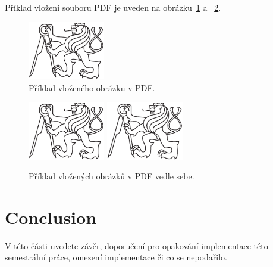 \documentclass[report,11pt]{elsarticle}
\begin{document}
Příklad vložení souboru PDF je uveden na obrázku~\ref{fig:fig1} a ~\ref{fig:fig2}.

\begin{figure}[!ht]
\begin{center}
  \includegraphics[width=0.3\textwidth]{cvut-logo-bw}
\caption{{\label{fig:fig1}}Příklad vloženého obrázku v PDF.}
\end{center}
\end{figure}

\begin{figure}[!ht]
\begin{center}
  \includegraphics[width=0.3\textwidth]{cvut-logo-bw}
  \includegraphics[width=0.3\textwidth]{cvut-logo-bw}
\caption{{\label{fig:fig2}}Příklad vložených obrázků v PDF vedle sebe.}
\end{center}
\end{figure}

\section{\label{SEC:Conclusion}Conclusion}

V této části uvedete závěr, doporučení pro opakování implementace této
semestrální práce, omezení implementace či co se nepodařilo.
\end{document}
